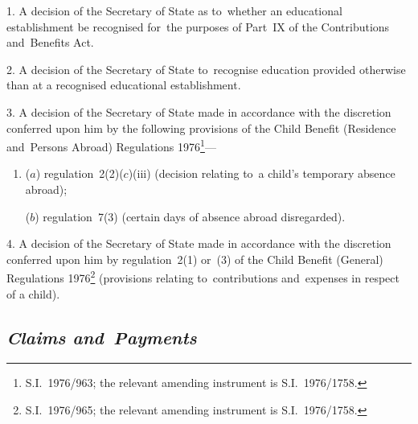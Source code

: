\documentclass[12pt,a4paper]{article}
\begin{document}
1.  A decision of the Secretary of State as to~whether an educational establishment be recognised for~the purposes of Part~IX of the Contributions and~Benefits Act.

\medskip

2.  A decision of the Secretary of State to~recognise education provided otherwise than at a recognised educational establishment.

\medskip

3.  A decision of the Secretary of State made in accordance with the discretion conferred upon him by the following provisions of the Child Benefit (Residence and~Persons Abroad) Regulations 1976\footnote{\frenchspacing S.I.~1976/963; the relevant amending instrument is S.I.~1976/1758.}—
\begin{enumerate}\item[]
($a$) regulation~2(2)($c$)(iii) (decision relating to~a child’s temporary absence abroad);

($b$) regulation~7(3) (certain days of absence abroad disregarded).
\end{enumerate}

\medskip

4.  A decision of the Secretary of State made in accordance with the discretion conferred upon him by regulation~2(1) or~(3) of the Child Benefit (General) Regulations 1976\footnote{\frenchspacing S.I.~1976/965; the relevant amending instrument is S.I.~1976/1758.} (provisions relating to~contributions and~expenses in respect of a child).

\subsection*{\itshape Claims and~Payments}
\end{document}

